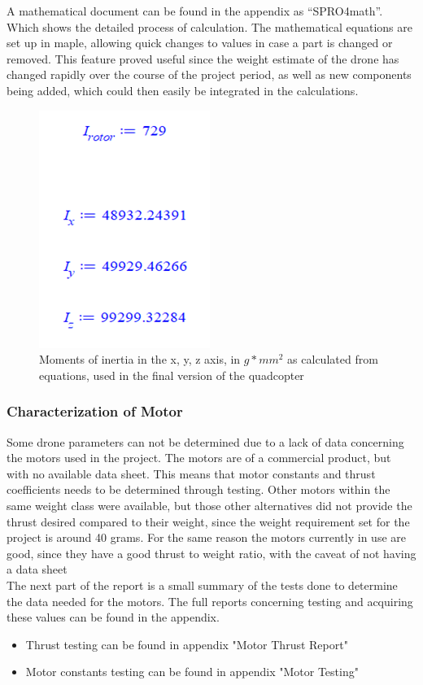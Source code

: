 A mathematical document can be found in the appendix as “SPRO4math”. Which shows the detailed process of calculation. The mathematical equations are set up in maple, allowing quick changes to values in case a part is changed or removed. This feature proved useful since the weight estimate of the drone has changed rapidly over the course of the project period, as well as new components being added, which could then easily be integrated in the calculations.\\

\begin{figure}[H]
\begin{center}
   \includegraphics[scale =1]{pictures/control/Inertia moments.png}
\end{center}
\caption{Moments of inertia in the x, y, z axis, in $g*mm^2$ as calculated from equations, used in the final version of the quadcopter}
\end{figure}

\subsubsection{Characterization of Motor}
Some drone parameters can not be determined due to a lack of data concerning the motors used in the project. The motors are of a commercial product, but with no available data sheet. This means that motor constants and thrust coefficients needs to be determined through testing. Other motors within the same weight class were available, but those other alternatives did not provide the thrust desired compared to their weight, since the weight requirement set for the project is around 40 grams. For the same reason the motors currently in use are good, since they have a good thrust to weight ratio, with the caveat of not having a data sheet\\
The next part of the report is a small summary of the tests done to determine the data needed for the motors. The full reports concerning testing and acquiring these values can be found in the appendix. 
\begin{itemize}
    \item Thrust testing can be found in appendix "Motor Thrust Report"
    \item Motor constants testing can be found in appendix "Motor Testing"
\end{itemize}

